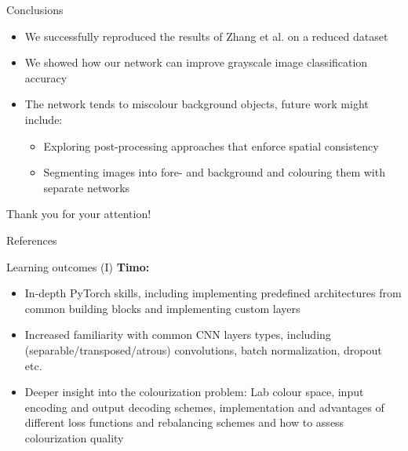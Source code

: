 \documentclass{beamer}
\begin{document}

\begin{frame}{Conclusions}
  \begin{itemize}
    \item We successfully reproduced the results of Zhang et al. on a reduced dataset
    \item We showed how our network can improve grayscale image classification accuracy
    \item The network tends to miscolour background objects, future work might include: \\
      \begin{itemize}
        \item Exploring post-processing approaches that enforce spatial consistency
        \item Segmenting images into fore- and background and colouring them with
              separate networks
      \end{itemize}
  \end{itemize}
\end{frame}


\begin{frame}
  \begin{center}
    \huge
    Thank you for your attention!
  \end{center}
\end{frame}

\begin{frame}[allowframebreaks,t]{References}
  \small
  
  
\end{frame}


\begin{frame}{Learning outcomes (I)}
  \textbf{Timo:}
    \begin{itemize}
      \item In-depth PyTorch skills, including implementing predefined
            architectures from common building blocks and implementing custom
            layers
      \item Increased familiarity with common CNN layers types, including
            (separable/transposed/atrous) convolutions, batch normalization,
            dropout etc.
      \item Deeper insight into the colourization problem: Lab colour space,
            input encoding and output decoding schemes, implementation and
            advantages of different loss functions and rebalancing schemes and
            how to assess colourization quality
    \end{itemize}
\end{frame}
\end{document}
